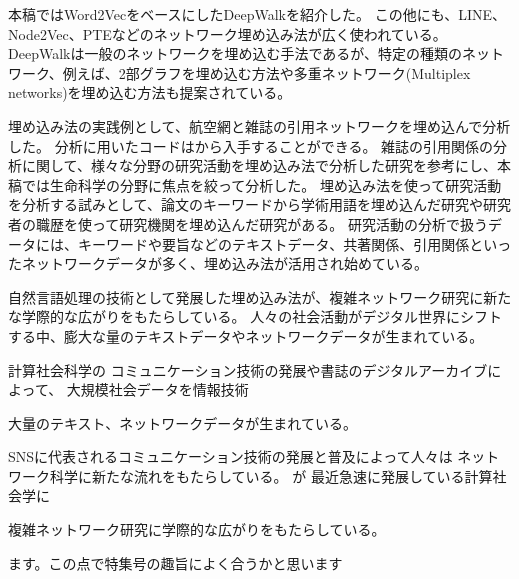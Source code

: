 \documentclass[J]{scitrans}
\begin{document}
本稿ではWord2VecをベースにしたDeepWalkを紹介した。
この他にも、LINE\cite{Tang:2015}、Node2Vec\cite{Grover:2016}、PTE\cite{Tang2015}などのネットワーク埋め込み法が広く使われている。 
DeepWalkは一般のネットワークを埋め込む手法であるが、特定の種類のネットワーク、例えば、2部グラフを埋め込む方法\cite{Gao2018}や多重ネットワーク(Multiplex networks)を埋め込む方法\cite{Dong2017}も提案されている。

埋め込み法の実践例として、航空網と雑誌の引用ネットワークを埋め込んで分析した。
分析に用いたコードは\cite{code}から入手することができる。
雑誌の引用関係の分析に関して、様々な分野の研究活動を埋め込み法で分析した研究\cite{Peng2020}を参考にし、本稿では生命科学の分野に焦点を絞って分析した。
埋め込み法を使って研究活動を分析する試みとして、論文のキーワードから学術用語を埋め込んだ研究\cite{Chinazzi2019,Ke2019}や研究者の職歴を使って研究機関を埋め込んだ研究がある。
研究活動の分析で扱うデータには、キーワードや要旨などのテキストデータ、共著関係、引用関係といったネットワークデータが多く、埋め込み法が活用され始めている。

自然言語処理の技術として発展した埋め込み法が、複雑ネットワーク研究に新たな学際的な広がりをもたらしている。
人々の社会活動がデジタル世界にシフトする中、膨大な量のテキストデータやネットワークデータが生まれている。

計算社会科学の
コミュニケーション技術の発展や書誌のデジタルアーカイブによって、
大規模社会データを情報技術

大量のテキスト、ネットワークデータが生まれている。

SNSに代表されるコミュニケーション技術の発展と普及によって人々は
ネットワーク科学に新たな流れをもたらしている。
が
最近急速に発展している計算社会学に

複雑ネットワーク研究に学際的な広がりをもたらしている。

ます。この点で特集号の趣旨によく合うかと思います

\
\acknowledgement







\end{document}
